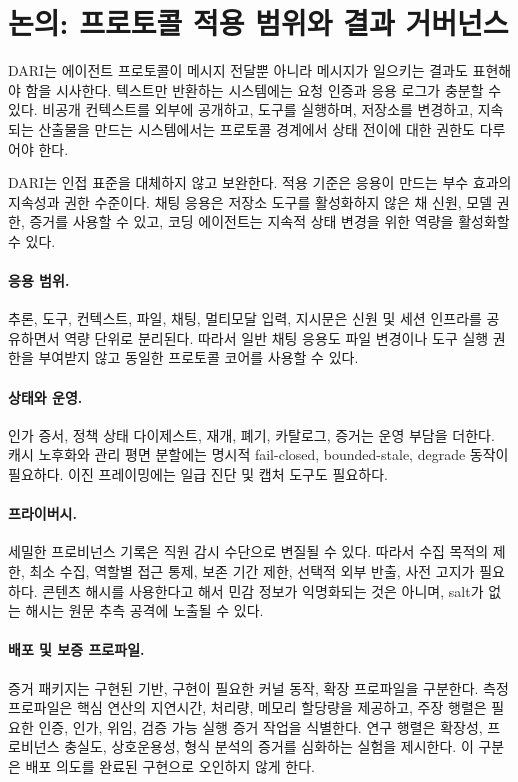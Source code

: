 \documentclass[10pt]{article}
\begin{document}
\section{논의: 프로토콜 적용 범위와 결과 거버넌스}

DARI는 에이전트 프로토콜이 메시지 전달뿐 아니라 메시지가 일으키는 결과도 표현해야 함을 시사한다. 텍스트만 반환하는 시스템에는 요청 인증과 응용 로그가 충분할 수 있다. 비공개 컨텍스트를 외부에 공개하고, 도구를 실행하며, 저장소를 변경하고, 지속되는 산출물을 만드는 시스템에서는 프로토콜 경계에서 상태 전이에 대한 권한도 다루어야 한다.

DARI는 인접 표준을 대체하지 않고 보완한다. 적용 기준은 응용이 만드는 부수 효과의 지속성과 권한 수준이다. 채팅 응용은 저장소 도구를 활성화하지 않은 채 신원, 모델 권한, 증거를 사용할 수 있고, 코딩 에이전트는 지속적 상태 변경을 위한 역량을 활성화할 수 있다.

\paragraph{응용 범위.}
추론, 도구, 컨텍스트, 파일, 채팅, 멀티모달 입력, 지시문은 신원 및 세션 인프라를 공유하면서 역량 단위로 분리된다. 따라서 일반 채팅 응용도 파일 변경이나 도구 실행 권한을 부여받지 않고 동일한 프로토콜 코어를 사용할 수 있다.

\paragraph{상태와 운영.}
인가 증서, 정책 상태 다이제스트, 재개, 폐기, 카탈로그, 증거는 운영 부담을 더한다. 캐시 노후화와 관리 평면 분할에는 명시적 fail-closed, bounded-stale, degrade 동작이 필요하다. 이진 프레이밍에는 일급 진단 및 캡처 도구도 필요하다.

\paragraph{프라이버시.}
세밀한 프로비넌스 기록은 직원 감시 수단으로 변질될 수 있다. 따라서 수집 목적의 제한, 최소 수집, 역할별 접근 통제, 보존 기간 제한, 선택적 외부 반출, 사전 고지가 필요하다. 콘텐츠 해시를 사용한다고 해서 민감 정보가 익명화되는 것은 아니며, salt가 없는 해시는 원문 추측 공격에 노출될 수 있다.

\paragraph{배포 및 보증 프로파일.}
증거 패키지는 구현된 기반, 구현이 필요한 커널 동작, 확장 프로파일을 구분한다. 측정 프로파일은 핵심 연산의 지연시간, 처리량, 메모리 할당량을 제공하고, 주장 행렬은 필요한 인증, 인가, 위임, 검증 가능 실행 증거 작업을 식별한다. 연구 행렬은 확장성, 프로비넌스 충실도, 상호운용성, 형식 분석의 증거를 심화하는 실험을 제시한다. 이 구분은 배포 의도를 완료된 구현으로 오인하지 않게 한다.
\end{document}

